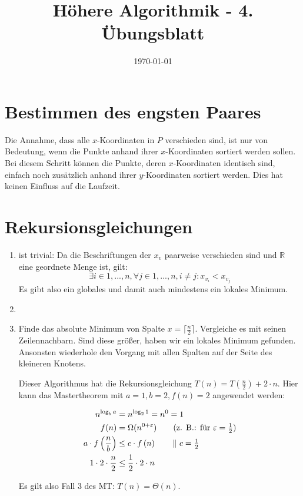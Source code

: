 \documentclass[a4paper,10pt]{scrartcl}
\title{H\"ohere Algorithmik - 4. \"Ubungsblatt}
\author{\Authors}
\date{\today}
\begin{document}
\maketitle

\section{Bestimmen des engsten Paares}
Die Annahme, dass alle $x$-Koordinaten in $P$ verschieden sind, ist nur
von Bedeutung, wenn die Punkte anhand ihrer $x$-Koordinaten sortiert
werden sollen. Bei diesem Schritt können die Punkte, deren
$x$-Koordinaten identisch sind, einfach noch zusätzlich anhand ihrer
$y$-Koordinaten sortiert werden. Dies hat keinen Einfluss auf die
Laufzeit.

\section{Rekursionsgleichungen}
\begin{enumerate}
\item	ist trivial: Da die Beschriftungen der $x_v$ paarweise
	verschieden sind und $\mathbb{R}$ eine geordnete Menge ist, gilt:
	\[\exists i \in {1,...,n}, \forall j \in {1,...,n}, i \neq j:
	x_{v_i} < x_{v_j}\]
	Es gibt also ein globales und damit auch mindestens ein lokales
	Minimum.
\item
\item	Finde das absolute Minimum von Spalte $x = \lceil \frac{n}{2}
	\rceil$. Vergleiche es mit seinen Zeilennachbarn. Sind diese größer,
	haben wir ein lokales Minimum gefunden. Ansonsten wiederhole den Vorgang
	mit allen Spalten auf der Seite des kleineren Knotens.

	Dieser Algorithmus hat die Rekursionsgleichung $T(n) =
	T(\frac{n}{2}) + 2 \cdot n$. Hier kann das Mastertheorem mit
	$a=1, b=2, f(n)=2$ angewendet werden:

	\begin{align*}
		 n^{\log_b a} &= n^{\log_2 1} = n^0 = 1 \\
		 f(n) &= \Omega(n^{0+\varepsilon}) \tag{z. B.: für $\varepsilon = \frac{1}{2}$} \\
		 a \cdot f\left(\frac{n}{b}\right) &\leq c \cdot f\left(n\right) \tag*{$\|\ c = \frac{1}{2}$} \\
		1 \cdot 2 \cdot \frac{n}{2} & \leq \frac{1}{2} \cdot 2 \cdot n
	\end{align*}

Es gilt also Fall 3 des MT: $T(n) = \Theta(n)$.
\end{enumerate}
\end{document}
